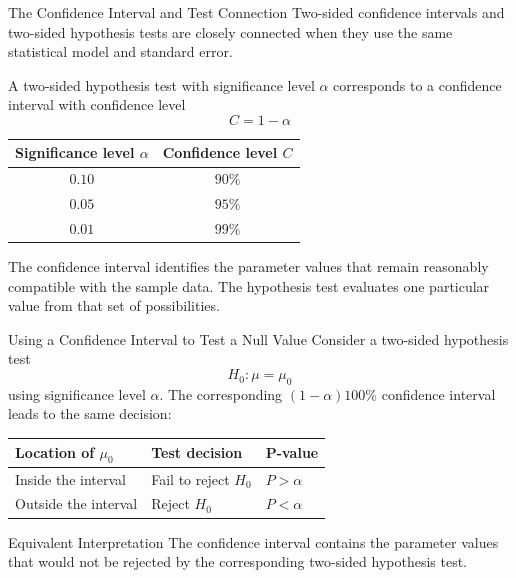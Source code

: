 \documentclass[aspectratio=169]{beamer}
\begin{document}
\begin{frame}{The Confidence Interval and Test Connection}
Two-sided confidence intervals and two-sided hypothesis tests are closely connected when they use the same statistical model and standard error.

\vspace{0.2cm}
A two-sided hypothesis test with significance level $\alpha$ corresponds to a confidence interval with confidence level
$$C=1-\alpha$$

\begin{center}
\begin{tabular}{cc}
\toprule
\textbf{Significance level $\alpha$} & \textbf{Confidence level $C$} \\
\midrule
$0.10$ & $90\%$ \\
$0.05$ & $95\%$ \\
$0.01$ & $99\%$ \\
\bottomrule
\end{tabular}
\end{center}

\vspace{0.15cm}
The confidence interval identifies the parameter values that remain reasonably compatible with the sample data. The hypothesis test evaluates one particular value from that set of possibilities.
\end{frame}

\begin{frame}{Using a Confidence Interval to Test a Null Value}
Consider a two-sided hypothesis test
$$H_0:\mu=\mu_0$$
using significance level $\alpha$. The corresponding $(1-\alpha)100\%$ confidence interval leads to the same decision:

\vspace{0.15cm}
\begin{center}
\begin{tabular}{lll}
\toprule
\textbf{Location of $\mu_0$} & \textbf{Test decision} & \textbf{P-value} \\
\midrule
Inside the interval
& Fail to reject $H_0$
& $P>\alpha$ \\[1mm]

Outside the interval
& Reject $H_0$
& $P<\alpha$ \\
\bottomrule
\end{tabular}
\end{center}
\begin{block}{Equivalent Interpretation}
The confidence interval contains the parameter values that would not be rejected by the corresponding two-sided hypothesis test.
\end{block}
\end{frame}
\end{document}

